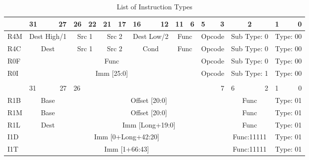 \documentclass{article}
\begin{document}
    \begin{table}[H]
    \centering
    \caption{List of Instruction Types}
    \label{table:inst_type}
    \begin{tabular}{|l|l|r|l|r|l|r|l|r|l|r|l|r|l|r|l|r|}


    \hline  & \multicolumn{1}{l}{31} & 27       & \multicolumn{1}{l}{26} & 22   & \multicolumn{1}{l}{21} & 17       & \multicolumn{1}{l}{16} & 12       & \multicolumn{1}{l}{11} & 6    & \multicolumn{1}{l}{5} & 3     & \multicolumn{2}{|c|}{2}           & \multicolumn{1}{l}{1} & 0 \\
    \hline R4M  & \multicolumn{2}{|c|}{Dest High/1} & \multicolumn{2}{|c|}{Src 1}   & \multicolumn{2}{|c|}{Src 2}       & \multicolumn{2}{|c|}{Dest Low/2}  & \multicolumn{2}{|c|}{Func}    & \multicolumn{2}{|c|}{Opcode}  & \multicolumn{2}{|c|}{Sub Type: 0} & \multicolumn{2}{|c|}{Type: 00} \\
    \hline R4C  & \multicolumn{2}{|c|}{Dest}        & \multicolumn{2}{|c|}{Src 1}   & \multicolumn{2}{|c|}{Src 2}       & \multicolumn{2}{|c|}{Cond}        & \multicolumn{2}{|c|}{Func}    & \multicolumn{2}{|c|}{Opcode}  & \multicolumn{2}{|c|}{Sub Type: 0} & \multicolumn{2}{|c|}{Type: 00} \\
    \hline R0F  & \multicolumn{10}{|c|}{Func}       & \multicolumn{2}{|c|}{Opcode}  & \multicolumn{2}{|c|}{Sub Type: 0} & \multicolumn{2}{|c|}{Type: 00} \\
    \hline R0I  & \multicolumn{10}{|c|}{Imm [25:0]} & \multicolumn{2}{|c|}{Opcode}  & \multicolumn{2}{|c|}{Sub Type: 1} & \multicolumn{2}{|c|}{Type: 00} \\ 

    \hline  \multicolumn{16}{c}{} \\

    \hline  & \multicolumn{1}{l}{31} & 27       & \multicolumn{9}{l}{26} & 7            & \multicolumn{1}{l}{6} & 2     & \multicolumn{1}{l}{1} & 0 \\
    \hline R1B  & \multicolumn{2}{|c|}{Base}        & \multicolumn{10}{|c|}{Offset [20:0]}      & \multicolumn{2}{|c|}{Func}    & \multicolumn{2}{|c|}{Type: 01} \\
    \hline R1M  & \multicolumn{2}{|c|}{Base}        & \multicolumn{10}{|c|}{Offset [20:0]}      & \multicolumn{2}{|c|}{Func}    & \multicolumn{2}{|c|}{Type: 01} \\
    \hline R1L  & \multicolumn{2}{|c|}{Dest}        & \multicolumn{10}{|c|}{Imm [Long+19:0]}    & \multicolumn{2}{|c|}{Func}    & \multicolumn{2}{|c|}{Type: 01} \\
    \hline I1D  & \multicolumn{12}{|c|}{Imm [0+Long+42:20]} & \multicolumn{2}{|c|}{Func:11111}  & \multicolumn{2}{|c|}{Type: 01} \\
    \hline I1T  & \multicolumn{12}{|c|}{Imm [1+66:43]}      & \multicolumn{2}{|c|}{Func:11111}  & \multicolumn{2}{|c|}{Type: 01} \\
    
    \hline
    \end{tabular}
    \end{table}
    
\end{document}
